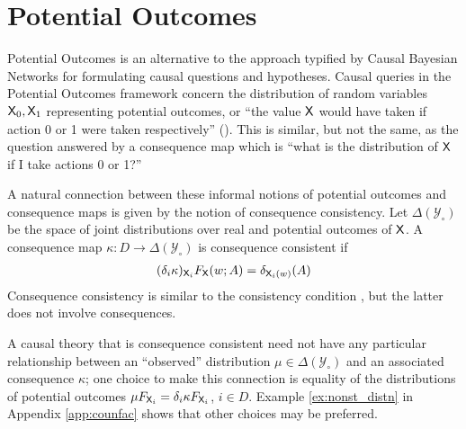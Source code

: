 
\section{Potential Outcomes}

Potential Outcomes is an alternative to the approach typified by Causal Bayesian Networks for formulating causal questions and hypotheses. Causal queries in the Potential Outcomes framework concern the distribution of random variables $\mathsf{X}_0, \mathsf{X}_1$ representing potential outcomes, or ``the value $\mathsf{X}$ would have taken if action 0 or 1 were taken respectively'' (\cite{hernan_causal_2018}). This is similar, but not the same, as the question answered by a consequence map which is ``what is the distribution of $\mathsf{X}$ if I take actions 0 or 1?''

A natural connection between these informal notions of potential outcomes and consequence maps is given by the notion of consequence consistency. Let $\Delta(\mathcal{Y}_\circ)$ be the space of joint distributions over real and potential outcomes of $\mathsf{X}$. A consequence map $\kappa:D\to \Delta(\mathcal{Y}_\circ)$ is consequence consistent if
\begin{align}
    (\delta_i\kappa)_{\mathsf{X}_i} F_{\mathsf{X}} (w;A)=\delta_{\mathsf{X}_i(w)}(A) \label{eq:oc_consist}
\end{align} 
Consequence consistency is similar to the consistency condition \citep{richardson2013single}, but the latter does not involve consequences.

A causal theory that is consequence consistent need not have any particular relationship between an ``observed'' distribution $\mu\in \Delta(\mathcal{Y}_\circ)$ and an associated consequence $\kappa$; one choice to make this connection is equality of the distributions of potential outcomes $\mu F_{\mathsf{X}_i} = \delta_i \kappa F_{\mathsf{X}_i}$, $i\in D$. Example \ref{ex:nonst_distn} in Appendix \ref{app:counfac} shows that other choices may be preferred.


